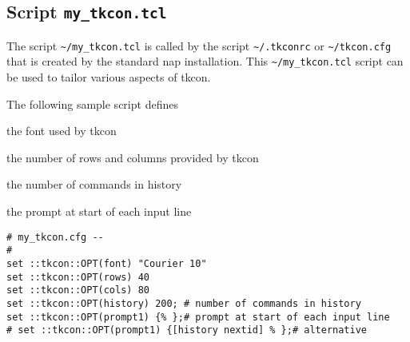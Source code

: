 \subsection{Script \texttt{my\_tkcon.tcl}}
    \label{scripts-my-tkcon}

The script 
  \verb!~/my_tkcon.tcl! is called by the script 
  \verb!~/.tkconrc! or 
  \verb!~/tkcon.cfg! that is created by the standard nap
  installation. This 
  \verb!~/my_tkcon.tcl! script can be used to tailor various
  aspects of tkcon.
  
 The following sample script defines
\begin{bullets}
    \item the font used by tkcon
    \item the number of rows and columns provided by tkcon
    \item the number of commands in history
    \item the prompt at start of each input line
\end{bullets}
\begin{verbatim}
# my_tkcon.cfg --
#
set ::tkcon::OPT(font) "Courier 10"
set ::tkcon::OPT(rows) 40
set ::tkcon::OPT(cols) 80
set ::tkcon::OPT(history) 200; # number of commands in history
set ::tkcon::OPT(prompt1) {% };# prompt at start of each input line
# set ::tkcon::OPT(prompt1) {[history nextid] % };# alternative
\end{verbatim}

